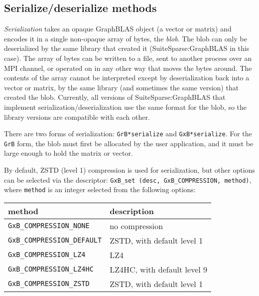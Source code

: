 \documentclass[12pt]{article}
\begin{document}
\subsection{Serialize/deserialize methods}
\label{serialize_deserialize}

{\em Serialization} takes an opaque GraphBLAS object (a vector or matrix) and
encodes it in a single non-opaque array of bytes, the {\em blob}.  The blob can
only be deserialized by the same library that created it (SuiteSparse:GraphBLAS
in this case).  The array of bytes can be written to a file, sent to another
process over an MPI channel, or operated on in any other way that moves the
bytes around.  The contents of the array cannot be interpreted except by
deserialization back into a vector or matrix, by the same library (and
sometimes the same version) that created the blob.  Currently, all versions of
SuiteSparse:GraphBLAS that implement serialization/deserialization use the same
format for the blob, so the library versions are compatible with each other.

There are two forms of serialization: \verb'GrB*serialize' and
\verb'GxB*serialize'.  For the \verb'GrB' form, the blob must first be
allocated by the user application, and it must be large enough to hold the
matrix or vector.

By default, ZSTD (level 1) compression is used for serialization, but other
options can be selected via the descriptor:
\verb'GxB_set (desc, GxB_COMPRESSION, method)', where \verb'method' is an
integer selected from the following options:

\vspace{0.2in}
{\footnotesize
\begin{tabular}{ll}
\hline
method                           &  description \\
\hline
\verb'GxB_COMPRESSION_NONE'      &  no compression \\
\verb'GxB_COMPRESSION_DEFAULT'   &  ZSTD, with default level 1 \\
\verb'GxB_COMPRESSION_LZ4'       &  LZ4 \\
\verb'GxB_COMPRESSION_LZ4HC'     &  LZ4HC, with default level 9 \\
\verb'GxB_COMPRESSION_ZSTD'      &  ZSTD, with default level 1 \\
\hline
\end{tabular} }
\vspace{0.2in}
\end{document}
